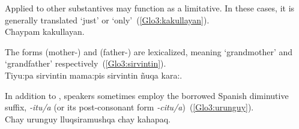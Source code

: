 \noindent
Applied to other substantives  may function as a limitative. In these cases, it is generally translated ‘just’ or ‘only’~(\ref{Glo3:kakullayan}).\\

%
{Chaypam kakullayan.}%
{}%
{}{}%

\noindent
The forms  (mother-) and  (father-) are lexicalized, meaning ‘grandmother’ and ‘grandfather’ respectively~(\ref{Glo3:sirvintin}).\\

%
{Tiyu:pa sirvintin mama:pis sirvintin ñuqa kara:.}%
{}%
{}{}%

\noindent
In addition to , speakers sometimes employ the borrowed Spanish diminutive suffix, \emph{-itu/a} (or its post-consonant form \emph{-citu/a})~(\ref{Glo3:urunguy}).\\

%
{Chay urunguy lluqsiramushqa chay kahapaq.}%
{}%
{}{}%
